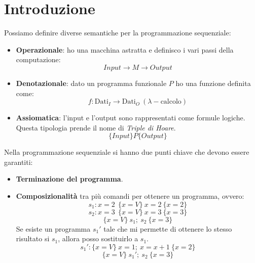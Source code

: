 \chapter{Introduzione}
Possiamo definire diverse semantiche per la programmazione sequenziale:
\begin{itemize}
    \item \textbf{Operazionale}: ho una macchina astratta e definisco i vari passi
          della computazione:
          \begin{equation}
              Input \longrightarrow M \longrightarrow Output
          \end{equation}
    \item \textbf{Denotazionale}: dato un programma funzionale $P$ ho una funzione
          definita come:
          \begin{equation}
              f: \text{Dati}_{I} \to \text{Dati}_{O} \ ( \lambda-\text{calcolo})
          \end{equation}
    \item \textbf{Assiomatica}: l'input e l'output sono rappresentati come formule
          logiche. Questa tipologia prende il nome di \textit{Triple di Hoare}.
          \begin{equation}
              \{Input\} P \{Output\}
          \end{equation}
\end{itemize}

Nella programmazione sequenziale si hanno due punti chiave che devono essere garantiti:
\begin{itemize}
    \item \textbf{Terminazione del programma}.
    \item \textbf{Composizionalità} tra più comandi per ottenere un programma, ovvero:
          $$s_1: x = 2 \ \ \{x = V\} \ x = 2 \ \{x = 2\}$$
          $$s_2: x = 3 \ \ \{x = V\} \ x = 3 \ \{x = 3\}$$
          $$\{x = V\} \ s_1; \ s_2 \ \{x = 3\}$$
          Se esiste un programma $s_1'$ tale che mi permette di ottenere lo stesso 
          risultato si $s_1$, allora posso sostituirlo a $s_1$.
          $$s_1':  \{x = V\} \ x = 1; \ x = x + 1\ \{x = 2\}$$
          $$\{x = V\} \ s_1'; \ s_2 \ \{x = 3\}$$
\end{itemize}

